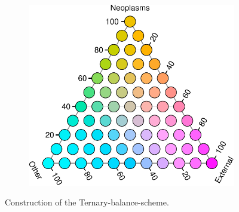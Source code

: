 \documentclass{scrartcl}
\begin{document}
\begin{appendix}
\begin{figure}[!htb]
\begin{subfigure}[t]{0.3\textwidth}
  \label{fig:ternlegend}
  \end{subfigure}%
  ~
  \begin{subfigure}[t]{0.3\textwidth}
  \includegraphics[width = \textwidth]{../fig/tern_balance_lgnd.pdf}
  \label{fig:tbslegend2}
  \end{subfigure}
  \caption{Con\-struc\-tion of the Ternary-balance-scheme.}
  \label{fig:tern_construction}
\end{figure}

\end{appendix}
\end{document}
